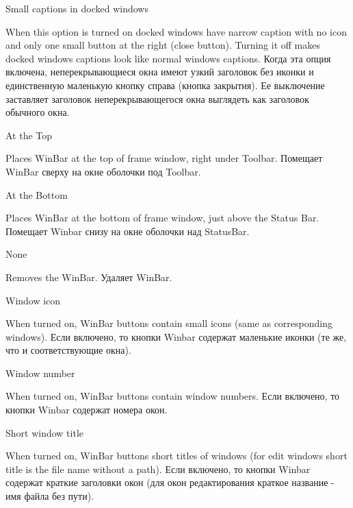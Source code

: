 \begin{popup}
\caption{Small captions in docked windows}
\ifenglish
When this option is turned on docked windows have narrow caption with no icon and
only one small button at the right (close button). Turning it off makes docked
windows captions look like normal windows captions.
 \else
Когда эта опция включена, неперекрывающиеся окна имеют узкий заголовок без иконки и 
единственную маленькую кнопку справа (кнопка закрытия). Ее выключение заставляет
заголовок неперекрывающегося окна выглядеть как заголовок обычного окна.
\fi
\end{popup}

\begin{popup}
\caption{At the Top}
\ifenglish
Places WinBar at the top of frame window, right under Toolbar.
 \else
Помещает WinBar сверху на окне оболочки под Toolbar.
\fi
\end{popup}

\begin{popup}
\caption{At the Bottom}

\ifenglish
Places WinBar at the bottom of frame window, just above the Status Bar.
 \else
Помещает Winbar снизу на окне оболочки над StatusBar.
\fi
\end{popup}

\begin{popup}
\caption{None}

\ifenglish
Removes the WinBar.
 \else
Удаляет WinBar.
\fi
\end{popup}

\begin{popup}
\caption{Window icon}

\ifenglish
When turned on, WinBar buttons contain small icons (same as corresponding windows).
 \else
Если включено, то кнопки Winbar содержат маленькие иконки (те же, что и 
соответствующие окна).
\fi
\end{popup}

\begin{popup}
\caption{Window number}

\ifenglish
When turned on, WinBar buttons contain window numbers.
 \else
Если включено, то кнопки Winbar содержат номера окон.
\fi
\end{popup}

\begin{popup}
\caption{Short window title}

\ifenglish
When turned on, WinBar buttons short titles of windows (for edit windows short
title is the file name without a path).
 \else
Если включено, то кнопки Winbar содержат краткие заголовки окон (для окон
редактирования краткое название - имя файла без пути).
\fi
\end{popup}
